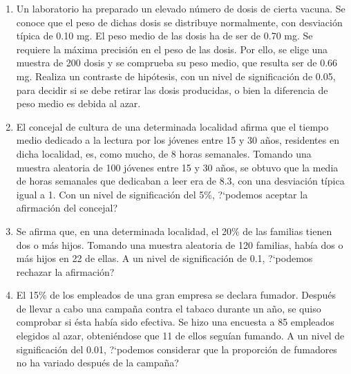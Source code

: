 \begin{adjustwidth}{20pt}{10pt}
\begin{enumerate}[PB. 1. ]
\item Un laboratorio ha preparado un elevado número de dosis de cierta vacuna. Se conoce que el peso de dichas dosis se distribuye normalmente, con desviación típica de 0.10 mg. El peso medio de las dosis ha de ser de 0.70 mg. Se requiere la máxima precisión en el peso de las dosis. Por ello, se elige una muestra de 200 dosis y se comprueba su peso medio, que resulta ser de 0.66 mg. Realiza un contraste de hipótesis, con un nivel de significación de 0.05, para decidir si se debe retirar las dosis producidas, o bien la diferencia de peso medio es debida al azar. 

\hspace{-15mm}\vspace{1cm}

\item El concejal de cultura de una determinada localidad afirma que el tiempo medio dedicado a la lectura por los jóvenes entre 15 y 30 años, residentes en dicha localidad, es, como mucho, de 8 horas semanales. Tomando una muestra aleatoria de 100 jóvenes entre 15 y 30 años, se obtuvo que la media de horas semanales que dedicaban a leer era de 8.3, con una desviación típica igual a 1. Con un nivel de significación del 5\%, ?`podemos aceptar la afirmación del concejal? 

\hspace{-15mm}\vspace{1cm}

\item Se afirma que, en una determinada localidad, el 20\% de las familias tienen dos o más hijos. Tomando una muestra aleatoria de 120 familias, había dos o más hijos en 22 de ellas. A un nivel de significación de 0.1, ?`podemos rechazar la afirmación? 

\hspace{-15mm}\vspace{1cm}

\item El 15\% de los empleados de una gran empresa se declara fumador. Después de llevar a cabo una campaña contra el tabaco durante un año, se quiso comprobar si ésta había sido efectiva. Se hizo una encuesta a 85 empleados elegidos al azar, obteniéndose que 11 de ellos seguían fumando. A un nivel de significación del 0.01, ?`podemos considerar que la proporción de fumadores no ha variado después de la campaña? 


\end{enumerate}
\end{adjustwidth}
